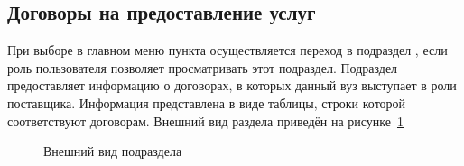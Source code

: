 	\subsection{Договоры на предоставление услуг}\label{agreement:provider_agreements_section}
При выборе в главном меню пункта  осуществляется переход в подраздел , если роль пользователя позволяет просматривать этот подраздел.
Подраздел предоставляет информацию о договорах, в которых данный вуз выступает в роли поставщика. Информация представлена в виде таблицы, строки которой соответствуют договорам. Внешний вид раздела  приведён на рисунке~\ref{agreement:provider_agreements}
	
	\begin{figure}[H]
	\caption{Внешний вид подраздела }
	\label{agreement:provider_agreements}
	\end{figure}
	
